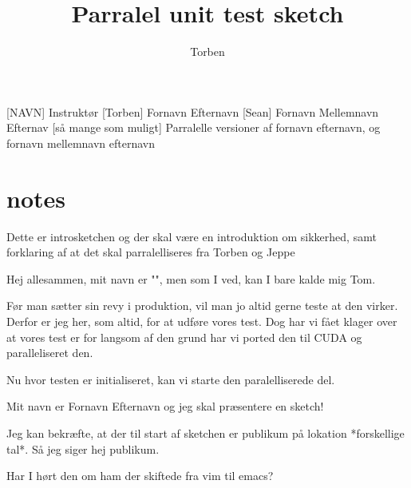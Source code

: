 \documentclass[a4paper,11pt]{article}
\title{Parralel unit test sketch}
\author{Torben}
\begin{document}
\maketitle

\begin{roles}
[NAVN] Instruktør
 [Torben] Fornavn Efternavn
 [Sean] Fornavn Mellemnavn Efternav
 [så mange som muligt] Parralelle versioner af fornavn efternavn, og fornavn mellemnavn efternavn 
\end{roles}

\begin{props}
\end{props}

\section*{notes}
Dette er introsketchen og der skal være en introduktion om sikkerhed, samt forklaring af at det skal parralelliseres fra Torben og Jeppe

\begin{sketch}



 Hej allesammen, mit navn er "", men som I ved, kan I bare kalde mig Tom.

 Før man sætter sin revy i produktion, vil man jo altid gerne teste at den virker. Derfor er jeg her, som altid, for at udføre vores test. Dog har vi fået klager over at vores test er for langsom af den grund har vi ported den til CUDA og paralleliseret den.

 Nu hvor testen er initialiseret, kan vi starte den paralelliserede del.


 Mit navn er Fornavn Efternavn og jeg skal præsentere en sketch!

 Jeg kan bekræfte, at der til start af sketchen er publikum på lokation *forskellige tal*. Så jeg siger hej publikum.

 Har I hørt den om ham der skiftede fra vim til emacs?
\end{sketch}
\end{document}
